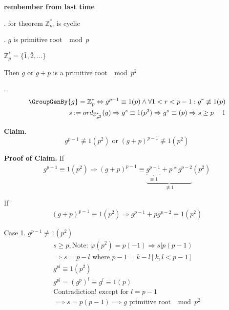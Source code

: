

\textbf{rembember from last time}

\Proof. 
for theorem $\mathbb{Z}_m^{*}$ is cyclic

\Lemma. $g$ is primitive root $\mod p$

$\mathbb{Z}_p^{*} = \{\bar{1}, \bar{2}, \ldots \}$

Then $g$ or $g+p$ is a primitive root $\mod p^2$

\Proof. 
\begin{align*}
  \GroupGenBy{g} = \mathbb{Z}_p^{*} \Leftrightarrow g^{p-1} \equiv 1 (p) \land \forall 1 < r < p-1 : g^r \not\equiv 1(p) \\
  s : = ord_{\mathbb{Z}_{p^2}^{*}} (g) \Rightarrow g^s \equiv 1 (p^2) \Rightarrow g^s \equiv (p) \Rightarrow s \geq p-1
\end{align*}

\textbf{Claim.}
\[
  g^{p-1} \not\equiv 1 (p^2) \text{ or } (g+p)^{p-1} \not\equiv 1(p^2)
\]

\textbf{Proof of Claim.}
If
\begin{align*}
  g^{p-1} \equiv 1(p^2) \Rightarrow (g+p)^{p-1} 
  \equiv \underbrace{\underbrace{g^{p-1}}_{\equiv 1} + p*g^{p-2}}_{\not\equiv 1} (p^2)
\end{align*}

If
\begin{align*}
  (g+p)^{p-1} \equiv 1(p^2) \Rightarrow g^{p-1} + pg^{p-2} \equiv 1 (p^2)
\end{align*}

Case 1. $g^{p-1} \not\equiv 1 (p^2)$
\begin{align*}
  s \geq p, \text{Note: } \varphi(p^2) = p(-1) \Rightarrow s|p(p-1) \\
  \Rightarrow s = p-l \text{ where } p-1 = k-l [k,l < p-1] \\
  g^{pl} \equiv 1 (p^2) \\
  g^{pl} = (g^p)^l \equiv g^l \equiv 1 (p) \\
  \text{Contradiction! except for } l = p-1 \\
  \implies s = p(p-1) \implies g \text{ primitive root } \mod p^2
\end{align*}


